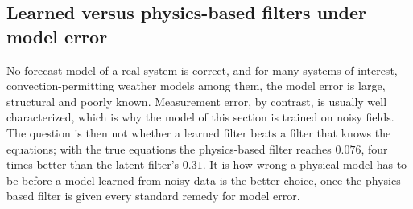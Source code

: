\begin{table}[htbp]
\caption{2D KS data assimilation across domain sizes, steady-state
analysis error in field units (cycles 51--100, 100 cycles), 64 members per
tiling. $\dlat$: latent dimension per tiling. Four tilings: seed 0, then
further seeds. Calibration: spread over error, four tilings, seed 0.
Interpolation: cubic spline of the observations. Decoder floor:
$\|\Dec(\E(u))-u\|$ with one tiling and blended over four. Free run: the
ensemble mean without assimilation, whose error depends on the truth's
large-scale variability (seed 0 at $330^2$ has a larger field variance; its
seed 1 gives $5.3$). ---: not run.}
\label{tab:da_2d_sizes}
\end{table}

\subsection{Learned versus physics-based filters under model error}
\label{sec:da_model_error}

No forecast model of a real system is correct, and for many systems of
interest, convection-permitting weather models among them, the model
error is large, structural and poorly known. Measurement error, by
contrast, is usually well characterized, which is why the model of this
section is trained on noisy fields. The question is then not whether a
learned filter beats a filter that knows the equations; with the true
equations the physics-based filter reaches $0.076$, four times better than
the latent filter's $0.31$. It is how wrong a physical model has to be
before a model learned from noisy data is the better choice, once the
physics-based filter is given every standard remedy for model error.

